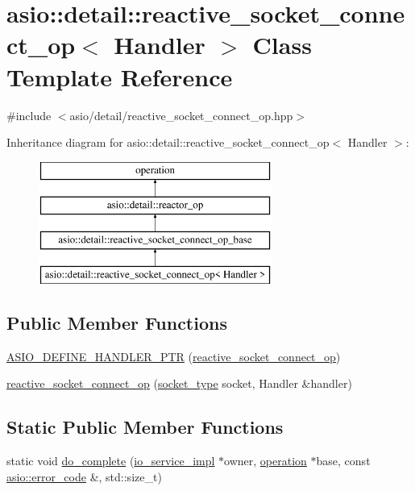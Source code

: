 \hypertarget{classasio_1_1detail_1_1reactive__socket__connect__op}{}\section{asio\+:\+:detail\+:\+:reactive\+\_\+socket\+\_\+connect\+\_\+op$<$ Handler $>$ Class Template Reference}
\label{classasio_1_1detail_1_1reactive__socket__connect__op}


{\ttfamily \#include $<$asio/detail/reactive\+\_\+socket\+\_\+connect\+\_\+op.\+hpp$>$}

Inheritance diagram for asio\+:\+:detail\+:\+:reactive\+\_\+socket\+\_\+connect\+\_\+op$<$ Handler $>$\+:\begin{figure}[H]
\begin{center}
\leavevmode
\includegraphics[height=4.000000cm]{classasio_1_1detail_1_1reactive__socket__connect__op}
\end{center}
\end{figure}
\subsection*{Public Member Functions}
\begin{DoxyCompactItemize}
\item 
\hyperlink{classasio_1_1detail_1_1reactive__socket__connect__op_ab94a8f12fec39d091239e90d597221c0}{A\+S\+I\+O\+\_\+\+D\+E\+F\+I\+N\+E\+\_\+\+H\+A\+N\+D\+L\+E\+R\+\_\+\+P\+T\+R} (\hyperlink{classasio_1_1detail_1_1reactive__socket__connect__op}{reactive\+\_\+socket\+\_\+connect\+\_\+op})
\item 
\hyperlink{classasio_1_1detail_1_1reactive__socket__connect__op_a538c47b6b1404a25776b9968f0a1f380}{reactive\+\_\+socket\+\_\+connect\+\_\+op} (\hyperlink{namespaceasio_1_1detail_a6798c771dd84b79798b1a08150706ea9}{socket\+\_\+type} socket, Handler \&handler)
\end{DoxyCompactItemize}
\subsection*{Static Public Member Functions}
\begin{DoxyCompactItemize}
\item 
static void \hyperlink{classasio_1_1detail_1_1reactive__socket__connect__op_ab46ada7c1ae3b640c2de3bb1fdb2d8c5}{do\+\_\+complete} (\hyperlink{namespaceasio_1_1detail_a6d61d9b8e53c11288be549d82aec5a42}{io\+\_\+service\+\_\+impl} $\ast$owner, \hyperlink{namespaceasio_1_1detail_a338968609bec20e37145309f8f9ec936}{operation} $\ast$base, const \hyperlink{classasio_1_1error__code}{asio\+::error\+\_\+code} \&, std\+::size\+\_\+t)
\end{DoxyCompactItemize}
